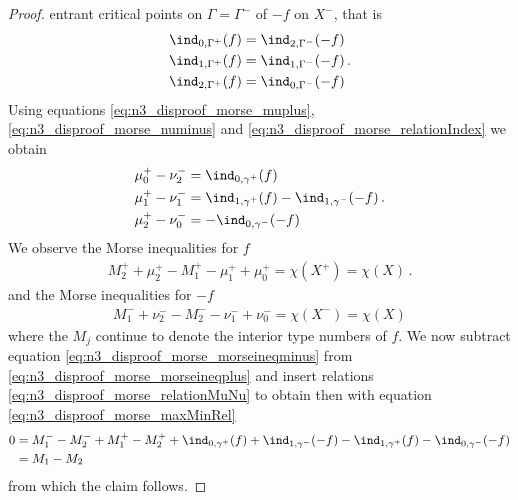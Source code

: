 \begin{proof}
  entrant critical points on $\Gamma=\Gamma^-$ of $-f$ on $X^-$, that is
  \begin{equation}
    \begin{aligned}
      \ind_{0,\Gamma^+}(f)&=\ind_{2,\Gamma^-}(-f) \\
      \ind_{1,\Gamma^+}(f)&=\ind_{1,\Gamma^-}(-f) \\
      \ind_{2,\Gamma^+}(f)&=\ind_{0,\Gamma^-}(-f)\label{eq:n3_disproof_morse_relationIndex} 
    \end{aligned}\,.
  \end{equation}
  Using equations \eqref{eq:n3_disproof_morse_muplus}, \eqref{eq:n3_disproof_morse_numinus} and \eqref{eq:n3_disproof_morse_relationIndex}
  we obtain
  \begin{equation}
    \begin{aligned}
      \mu^+_0-\nu^-_2&=\ind_{0,\gamma^+}(f) \\
      \mu^+_1-\nu^-_1&=\ind_{1,\gamma^+}(f)-\ind_{1,\gamma^-}(-f) \\
      \mu^+_2-\nu^-_0&=-\ind_{0,\gamma^-}(-f)
    \end{aligned}\,.\label{eq:n3_disproof_morse_relationMuNu}
  \end{equation}
  We observe the Morse inequalities for $f$
  \begin{align}
    M_2^++\mu^+_2-M_1^+-\mu^+_1+\mu^+_0=\chi(X^+)=\chi(X)\,.\label{eq:n3_disproof_morse_morseineqplus}
  \end{align}
  and the Morse inequalities for $-f$
  \begin{align}
    M_1^-+\nu^-_2-M_2^--\nu^-_1+\nu^-_0=\chi(X^-)=\chi(X)\label{eq:n3_disproof_morse_morseineqminus}
  \end{align}
  where the $M_j$ continue to denote the interior type numbers of $f$.
  We now subtract equation \eqref{eq:n3_disproof_morse_morseineqminus} from \eqref{eq:n3_disproof_morse_morseineqplus}
  and insert relations \eqref{eq:n3_disproof_morse_relationMuNu} to obtain
  then with equation \eqref{eq:n3_disproof_morse_maxMinRel}
  \begin{align*}
    0&=M_1^--M_2^-+M_1^+-M_2^++\ind_{0,\gamma^+}(f)+\ind_{1,\gamma^-}(-f)-\ind_{1,\gamma^+}(f)-\ind_{0,\gamma^-}(-f) \\
    &= M_1-M_2
  \end{align*}
  from which the claim follows.


\end{proof}
